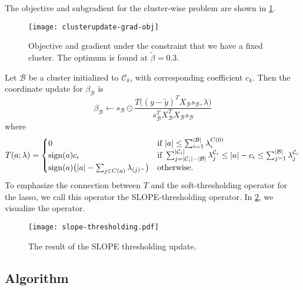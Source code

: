 The objective and subgradient for the cluster-wise problem are shown in
\cref{fig:cluster-grad-obj}.

\begin{figure}[htbp]
  \centering
  \texttt{[image: clusterupdate-grad-obj]}
  \caption{%
    Objective and gradient under the constraint that we have a fixed
    cluster.
    The optimum is found at \(\tilde\beta = 0.3\).
  }%
  \label{fig:cluster-grad-obj}
\end{figure}

Let \(\mathcal{B}\) be a cluster initialized to \(\mathcal{C}_k\), with
corresponding coefficient \(c_k\).
Then the coordinate update for \(\beta_\mathcal{B}\) is
\[
  \beta_\mathcal{B} \gets
  s_\mathcal{B} \odot
  \frac{
    T \big(
    (y - \tilde y)^T X_{\mathcal{B}} s_{\mathcal{B}}, \lambda\big)
  }{
    s_{\mathcal{B}}^T X_{\mathcal{B}}^T X_{\mathcal{B}} s_{\mathcal{B}}
  }
\]
where
\begin{equation}
  \label{eq:slope-thresholding}
  T(a; \lambda) =
  \begin{cases}
    0                                                        & \text{if } |a| \leq \sum_{i=1}^{|\mathcal{B}|}\lambda^{C(0)}_i                                                                                                                      \\
    \operatorname{sign}(a)c_i                                              & \text{if } \sum_{j= |\mathcal{C}_i| - |\mathcal{B}|}^{|\mathcal{C}_i|} \lambda^{\mathcal{C}_i}_j \leq |a| - c_i \leq \sum_{j=1}^{|\mathcal{B}|}\lambda^{\mathcal{C}_i}_j \\
    \operatorname{sign}(a)\big(|a| - \sum_{j \in C(a)}\lambda_{(j)^-}\big) & \text{otherwise.
    }
  \end{cases}
\end{equation}
To emphasize the connection between \(T\) and the soft-thresholding operator
for the lasso, we call this operator the SLOPE-thresholding operator.
In \cref{fig:slope-thresholding}, we visualize the operator.

\begin{figure}[htbp]
  \centering
  \texttt{[image: slope-thresholding.pdf]}
  \caption{The result of the SLOPE thresholding update.}
  \label{fig:slope-thresholding}
\end{figure}

\subsection{Algorithm}

